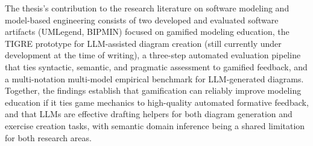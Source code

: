 The thesis's contribution to the research literature on software modeling and model-based engineering consists of two developed and evaluated software artifacts (UMLegend, BIPMIN) focused on gamified modeling education, the TIGRE prototype for LLM-assisted diagram creation (still currently under development at the time of writing), a three-step automated evaluation pipeline that ties syntactic, semantic, and pragmatic assessment to gamified feedback, and a multi-notation multi-model empirical benchmark for LLM-generated diagrams. Together, the findings establish that gamification can reliably improve modeling education if it ties game mechanics to high-quality automated formative feedback, and that LLMs are effective drafting helpers for both diagram generation and exercise creation tasks, with semantic domain inference being a shared limitation for both research areas.

\emptypage %

\tablespagetrue\figurespagetrue 
\allcontents

\mainmatter 









\backmatter

\printnomencl

\nocite{*}

\printbibliography[heading=bibintoc]

\printindex



